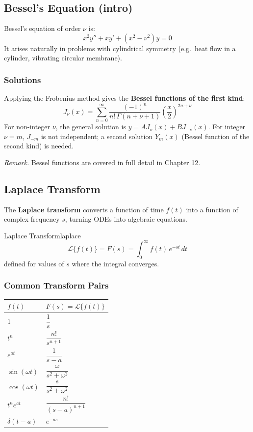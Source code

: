 \documentclass[11pt, letterpaper]{article}
\theoremstyle{plain}
\newenvironment{remark}{\smallskip\noindent\textit{Remark.}}{\smallskip}
\begin{document}
\subsection{Bessel's Equation (intro)}

Bessel's equation of order $\nu$ is:
\[
    x^2 y'' + xy' + (x^2 - \nu^2)y = 0
\]
It arises naturally in problems with cylindrical symmetry (e.g.\ heat flow
in a cylinder, vibrating circular membrane).

\subsubsection*{Solutions}
Applying the Frobenius method gives the \textbf{Bessel functions of the first kind}:
\[
    J_\nu(x) = \sum_{n=0}^{\infty}
    \frac{(-1)^n}{n!\,\Gamma(n+\nu+1)}\left(\frac{x}{2}\right)^{2n+\nu}
\]
For non-integer $\nu$, the general solution is $y = AJ_\nu(x) + BJ_{-\nu}(x)$.
For integer $\nu = m$, $J_{-m}$ is not independent; a second solution
$Y_m(x)$ (Bessel function of the second kind) is needed.

\begin{remark}
    Bessel functions are covered in full detail in Chapter 12.
\end{remark}

\subsection{Laplace Transform}

The \textbf{Laplace transform} converts a function of time $f(t)$ into a
function of complex frequency $s$, turning ODEs into algebraic equations.

\begin{definition}{Laplace Transform}{laplace}
    \[
        \mathcal{L}\{f(t)\} = F(s) = \int_0^{\infty} f(t)\,e^{-st}\,dt
    \]
    defined for values of $s$ where the integral converges.
\end{definition}

\subsubsection*{Common Transform Pairs}

\begin{center}
\begin{tabular}{ll}
    \toprule
    $f(t)$ & $F(s) = \mathcal{L}\{f(t)\}$ \\
    \midrule
    $1$                  & $\dfrac{1}{s}$ \\[8pt]
    $t^n$                & $\dfrac{n!}{s^{n+1}}$ \\[8pt]
    $e^{at}$             & $\dfrac{1}{s-a}$ \\[8pt]
    $\sin(\omega t)$     & $\dfrac{\omega}{s^2+\omega^2}$ \\[8pt]
    $\cos(\omega t)$     & $\dfrac{s}{s^2+\omega^2}$ \\[8pt]
    $t^n e^{at}$         & $\dfrac{n!}{(s-a)^{n+1}}$ \\[8pt]
    $\delta(t - a)$      & $e^{-as}$ \\
    \bottomrule
\end{tabular}
\end{center}
\end{document}
